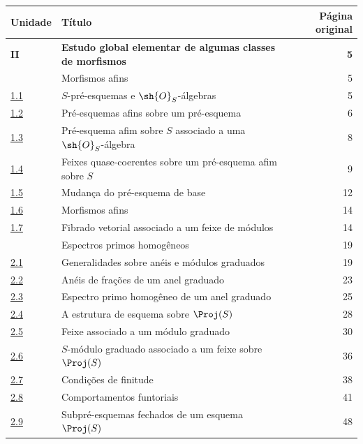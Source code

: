 \documentclass[oneside,10pt]{amsart}
\begin{document}
\begingroup
\small
\renewcommand{\arraystretch}{1.04}
\begin{longtable}{@{}p{}p{}r@{}}
\textbf{Unidade} & \textbf{Título} & \textbf{Página original}\\
\hline
\textbf{II} & \textbf{Estudo global elementar de algumas classes de morfismos} & \textbf{5}\\
\hyperref[section:II.1]{\textsection1} & Morfismos afins & 5\\
\hyperref[subsection:II.1.1]{1.1} & $S$-pré-esquemas e $\sh{O}_S$-álgebras & 5\\
\hyperref[subsection:II.1.2]{1.2} & Pré-esquemas afins sobre um pré-esquema & 6\\
\hyperref[subsection:II.1.3]{1.3} & Pré-esquema afim sobre $S$ associado a uma $\sh{O}_S$-álgebra & 8\\
\hyperref[subsection:II.1.4]{1.4} & Feixes quase-coerentes sobre um pré-esquema afim sobre $S$ & 9\\
\hyperref[subsection:II.1.5]{1.5} & Mudança do pré-esquema de base & 12\\
\hyperref[subsection:II.1.6]{1.6} & Morfismos afins & 14\\
\hyperref[subsection:II.1.7]{1.7} & Fibrado vetorial associado a um feixe de módulos & 14\\
\hyperref[section:II.2]{\textsection2} & Espectros primos homogêneos & 19\\
\hyperref[subsection:II.2.1]{2.1} & Generalidades sobre anéis e módulos graduados & 19\\
\hyperref[subsection:II.2.2]{2.2} & Anéis de frações de um anel graduado & 23\\
\hyperref[subsection:II.2.3]{2.3} & Espectro primo homogêneo de um anel graduado & 25\\
\hyperref[subsection:II.2.4]{2.4} & A estrutura de esquema sobre $\Proj(S)$ & 28\\
\hyperref[subsection:II.2.5]{2.5} & Feixe associado a um módulo graduado & 30\\
\hyperref[subsection:II.2.6]{2.6} & $S$-módulo graduado associado a um feixe sobre $\Proj(S)$ & 36\\
\hyperref[subsection:II.2.7]{2.7} & Condições de finitude & 38\\
\hyperref[subsection:II.2.8]{2.8} & Comportamentos funtoriais & 41\\
\hyperref[subsection:II.2.9]{2.9} & Subpré-esquemas fechados de um esquema $\Proj(S)$ & 48\\

\end{longtable}
\end{document}
